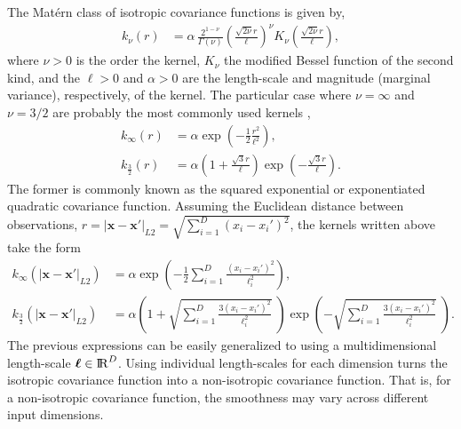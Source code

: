 \documentclass[onecolumn,a4paper,11pt]{article}
\begin{document}
The Mat\'ern class of isotropic covariance functions is given by, 
%
\begin{align*}
k_{\nu}(r)&=\alpha \, \frac{2^{1-\nu}}{\Gamma(\nu)}\left(\frac{\sqrt{2\nu}r}{\ell}\right)^{\!\nu} \! K_{\nu} \left(\frac{\sqrt{2\nu}r}{\ell}\right),
\end{align*}
%
where $\nu > 0$ is the order the kernel, $K_{\nu}$ the modified Bessel function of the second kind, and the $\ell > 0$ and $\alpha > 0$ are the length-scale and magnitude (marginal variance), respectively, of the kernel. The particular case where $\nu=\infty$ and $\nu=3/2$ are probably the most commonly used kernels \citep{rasmussen2006gaussian}, 
%
\begin{align*}
k_{\infty}(r)&=\alpha \exp \left( -\frac{1}{2} \frac{r^2}{\ell^2}\right),  \\
k_{\frac{3}{2}}(r)&=\alpha\left(1+\frac{\sqrt{3}r}{\ell}\right) \exp\! \left( -\frac{\sqrt{3}r}{\ell}\right). 
\end{align*}
%
The former is commonly known as the squared exponential or exponentiated quadratic covariance function. Assuming the Euclidean distance between observations, $r=|\bm{x}-\bm{x}'|_{L2}=\sqrt{\sum_{i=1}^{D}(x_i-x_i')^2}$, the kernels written above take the form
%
\begin{align*}
k_{\infty}(|\bm{x}-\bm{x}'|_{L2})&=\alpha \exp \left( -\frac{1}{2} \sum_{i=1}^{D}\frac{(x_i-x_i')^2}{\ell_i^2}\right),\\
k_{\frac{3}{2}}(|\bm{x}-\bm{x}'|_{L2})&=\alpha \left(1+\sqrt{\sum_{i=1}^{D}\frac{3(x_i-x_i')^2}{\ell_i^2}}\;\right) \exp\! \left( - \sqrt{\sum_{i=1}^{D}\frac{3(x_i-x_i')^2}{\ell_i^2}}\;\right).
\end{align*}
%
The previous expressions can be easily generalized to using a multidimensional length-scale $\bm{\ell}\in {\rm I\!R}^D$. Using individual length-scales for each dimension turns the isotropic covariance function into a non-isotropic covariance function. That is, for a non-isotropic covariance function, the smoothness may vary across different input dimensions. 
\end{document}
